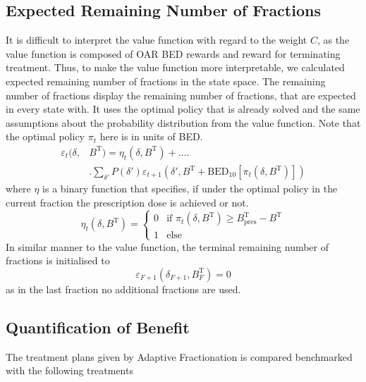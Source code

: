 \documentclass[\relativeRoot/ada.tex]{subfiles}
\begin{document}
\subsection{Expected Remaining Number of Fractions}
It is difficult to interpret the value function with regard to the weight $C$, as the value function is composed of OAR BED rewards and reward for terminating treatment. Thus, to make the value function more interpretable, we calculated expected remaining number of fractions in the state space. The remaining number of fractions display the remaining number of fractions, that are expected in every state with. It uses the optimal policy that is already solved and the same assumptions about the probability distribution from the value function. Note that the optimal policy $\pi_t$ here is in units of BED.
\begin{equation}\label{eq:remains_function}
    \begin{split}
    \varepsilon_t(\delta, & B^{\text{T}}) =
    \eta _t (\delta, B^{\text{T}}) + \ldots \Biggr.\\
    & \Biggr. \sum_{\delta'}P(\delta') \varepsilon_{t+1} \left( \delta', B^{\text{T}} + \text{BED}_{10} \left[ \pi_t(\delta, B^{\text{T}}) \right] \right)
    \end{split}
\end{equation}
where $\eta$ is a binary function that specifies, if under the optimal policy in the current fraction the prescription dose is achieved or not.
\begin{equation}\label{eq:current_remains}
    \eta_t (\delta, B^{\text{T}}) =
    \begin{cases}
        0 & \text{if } \pi_t(\delta, B^{\text{T}}) \geq B_{\text{pres}}^{\text{T}} - B^{\text{T}} \\
        1 & \text{else}
    \end{cases}
\end{equation}
In similar manner to the value function, the terminal remaining number of fractions is initialised to
\begin{equation*}
    \varepsilon_{F+1}(\delta_{F+1}, B^\text{T}_{F}) = 0
\end{equation*}
as in the last fraction no additional fractions are used.

\subsection{Quantification of Benefit}

The treatment plans given by Adaptive Fractionation is compared benchmarked with the following treatments
\end{document}
